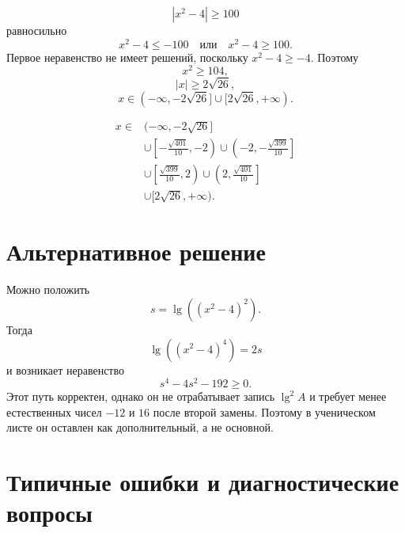
\[
  |x^2-4|\ge100
\]
равносильно
\[
  x^2-4\le-100
  \quad\text{или}\quad
  x^2-4\ge100.
\]
Первое неравенство не имеет решений, поскольку \(x^2-4\ge-4\). Поэтому
\[
  x^2\ge104,
\]
\[
  |x|\ge2\sqrt{26},
\]
\[
  x\in(-\infty,-2\sqrt{26}]\cup[2\sqrt{26},+\infty).
\]


\[
\boxed{
\begin{aligned}
  x\in{}&(-\infty,-2\sqrt{26}]\\
  &\cup\left[-\frac{\sqrt{401}}{10},-2\right)
  \cup\left(-2,-\frac{\sqrt{399}}{10}\right]\\
  &\cup\left[\frac{\sqrt{399}}{10},2\right)
  \cup\left(2,\frac{\sqrt{401}}{10}\right]\\
  &\cup[2\sqrt{26},+\infty).
\end{aligned}}
\]

\finalnumberlineteacherfigure

\section{Альтернативное решение}

\begin{methodintro}
  Можно положить
  \[
    s=\lg((x^2-4)^2).
  \]
  Тогда
  \[
    \lg((x^2-4)^4)=2s
  \]
  и возникает неравенство
  \[
    s^4-4s^2-192\ge0.
  \]
  Этот путь корректен, однако он не отрабатывает запись \(\lg^2 A\) и
  требует менее естественных чисел \(-12\) и \(16\) после второй замены.
  Поэтому в ученическом листе он оставлен как дополнительный, а не основной.
\end{methodintro}

\section{Типичные ошибки и диагностические вопросы}

